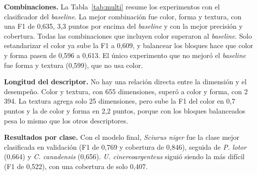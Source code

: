 \textbf{Combinaciones.} La Tabla~\ref{tab:multi} resume los experimentos con el clasificador del \textit{baseline}. La mejor combinación fue color, forma y textura, con una F1 de 0,635, 3,3 puntos por encima del \textit{baseline} y con la mejor precisión y cobertura. Todas las combinaciones que incluyen color superaron al \textit{baseline}. Solo estandarizar el color ya sube la F1 a 0,609, y balancear los bloques hace que color y forma pasen de 0,596 a 0,613. El único experimento que no mejoró el \textit{baseline} fue forma y textura (0,599), que no usa color.

\textbf{Longitud del descriptor.} No hay una relación directa entre la dimensión y el desempeño. Color y textura, con 655 dimensiones, superó a color y forma, con 2\,394. La textura agrega solo 25 dimensiones, pero sube la F1 del color en 0,7 puntos y la de color y forma en 2,2 puntos, porque con los bloques balanceados pesa lo mismo que los otros descriptores.

\textbf{Resultados por clase.} Con el modelo final, \textit{Sciurus niger} fue la clase mejor clasificada en validación (F1 de 0,769 y cobertura de 0,846), seguida de \textit{P. lotor} (0,664) y \textit{C. canadensis} (0,656). \textit{U. cinereoargenteus} siguió siendo la más difícil (F1 de 0,522), con una cobertura de solo 0,407.
